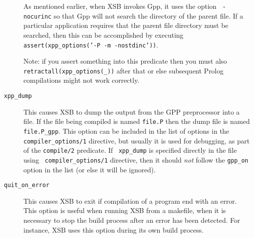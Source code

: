 \begin{description}
  As mentioned earlier, when XSB invokes Gpp, it uses the option {\tt
    -nocurinc} so that Gpp will not search the directory of the parent file. 
  If a particular application requires that the parent file directory
  must be searched, then this can be accomplished by executing 
  {\tt assert(xpp\_options('-P -m -nostdinc'))}.
  
  Note: if you assert something into this predicate then you must also {\tt
    retractall(xpp\_options(\_))} after that or else subsequent Prolog
  compilations might not work correctly.
  
\item[{\tt xpp\_dump}] 
  This causes XSB to dump the output from the GPP preprocessor into a file.
  If the file being compiled is named {\tt file.P} then the dump file is
  named {\tt file.P\_gpp}. This option can be included in the list of
  options in the {\tt compiler\_options/1} directive, but usually it is
  used for debugging, as part of the {\tt compile/2} predicate. If {\tt
    xpp\_dump} is specified directly in the file using {\tt
    compiler\_options/1} directive, then it should \emph{not} follow the
  {\tt gpp\_on} option in the list (or else it will be ignored).

\item[{\tt quit\_on\_error}] 
  This causes XSB to exit if compilation of a program end with an error.
  This option is useful when running XSB from a makefile, when it is
  necessary to stop the build process after an error has been detected. For
  instance, XSB uses this option during its own build process.



\end{description}
